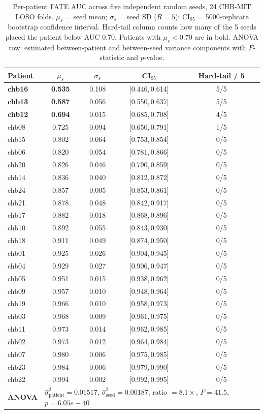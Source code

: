 \begin{table}[H]
\caption{Per-patient FATE AUC across five independent random seeds, 24 CHB-MIT
  LOSO folds. $\mu_s$ = seed mean; $\sigma_s$ = seed SD ($R{=}5$);
  CI$_{95}$ = 5000-replicate bootstrap confidence interval.
  Hard-tail column counts how many of the 5 seeds placed the patient below
  AUC 0.70. Patients with $\mu_s < 0.70$ are in bold.
  ANOVA row: estimated between-patient and between-seed variance components
  with $F$-statistic and $p$-value.}
\label{tab:multiseed}
\setlength{\tabcolsep}{4pt}
\begin{tabular}{lcccc}
\toprule
Patient & $\mu_s$ & $\sigma_s$ & CI$_{95}$ & Hard-tail / 5 \\
\midrule
  \textbf{chb16} & \textbf{0.535} & 0.108 & [0.446,\,0.614] & 5/5 \\
  \textbf{chb13} & \textbf{0.587} & 0.056 & [0.550,\,0.637] & 5/5 \\
  \textbf{chb12} & \textbf{0.694} & 0.015 & [0.685,\,0.708] & 4/5 \\
  chb08 & 0.725 & 0.094 & [0.650,\,0.791] & 1/5 \\
  chb15 & 0.802 & 0.064 & [0.753,\,0.854] & 0/5 \\
  chb06 & 0.820 & 0.054 & [0.781,\,0.866] & 0/5 \\
  chb20 & 0.826 & 0.046 & [0.790,\,0.859] & 0/5 \\
  chb14 & 0.836 & 0.040 & [0.812,\,0.872] & 0/5 \\
  chb24 & 0.857 & 0.005 & [0.853,\,0.861] & 0/5 \\
  chb21 & 0.878 & 0.048 & [0.842,\,0.917] & 0/5 \\
  chb17 & 0.882 & 0.018 & [0.868,\,0.896] & 0/5 \\
  chb10 & 0.892 & 0.055 & [0.843,\,0.930] & 0/5 \\
  chb18 & 0.911 & 0.049 & [0.874,\,0.950] & 0/5 \\
  chb01 & 0.925 & 0.026 & [0.904,\,0.945] & 0/5 \\
  chb04 & 0.929 & 0.027 & [0.906,\,0.947] & 0/5 \\
  chb05 & 0.951 & 0.015 & [0.938,\,0.962] & 0/5 \\
  chb09 & 0.957 & 0.010 & [0.948,\,0.964] & 0/5 \\
  chb19 & 0.966 & 0.010 & [0.958,\,0.973] & 0/5 \\
  chb03 & 0.968 & 0.009 & [0.961,\,0.975] & 0/5 \\
  chb11 & 0.973 & 0.014 & [0.962,\,0.985] & 0/5 \\
  chb02 & 0.973 & 0.012 & [0.964,\,0.984] & 0/5 \\
  chb07 & 0.980 & 0.006 & [0.975,\,0.985] & 0/5 \\
  chb23 & 0.984 & 0.006 & [0.979,\,0.990] & 0/5 \\
  chb22 & 0.994 & 0.002 & [0.992,\,0.995] & 0/5 \\
\midrule
  \textbf{ANOVA} & \multicolumn{4}{l}{$\hat\sigma^2_{\text{patient}} = 0.01517$, $\hat\sigma^2_{\text{seed}} = 0.00187$, ratio $= 8.1\times$, $F = 41.5$, $p = 6.05e-40$} \\
\bottomrule
\end{tabular}
\end{table}
